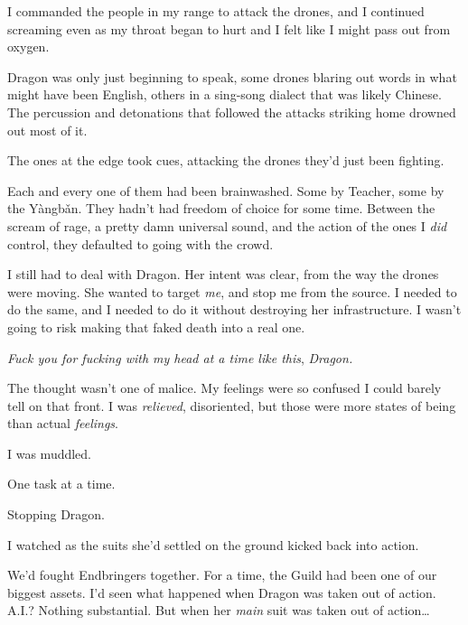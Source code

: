 I commanded the people in my range to attack the drones, and I continued screaming even as my throat began to hurt and I felt like I might pass out from oxygen.



Dragon was only just beginning to speak, some drones blaring out words in what might have been English, others in a sing-song dialect that was likely Chinese.  The percussion and detonations that followed the attacks striking home drowned out most of it.



The ones at the edge took cues, attacking the drones they'd just been fighting.



Each and every one of them had been brainwashed.  Some by Teacher, some by the Y\`{a}ngb\v{a}n. They hadn't had freedom of choice for some time.  Between the scream of rage, a pretty damn universal sound, and the action of the ones I \emph{did} control, they defaulted to going with the crowd.



I still had to deal with Dragon.  Her intent was clear, from the way the drones were moving.  She wanted to target \emph{me}, and stop me from the source.  I needed to do the same, and I needed to do it without destroying her infrastructure.  I wasn't going to risk making that faked death into a real one.



\emph{Fuck you for fucking with my head at a time like this}, \emph{Dragon.}



The thought wasn't one of malice.  My feelings were so confused I could barely tell on that front.  I was \emph{relieved}, disoriented, but those were more states of being than actual \emph{feelings}.



I was muddled.



One task at a time.



Stopping Dragon.



I watched as the suits she'd settled on the ground kicked back into action.



We'd fought Endbringers together.  For a time, the Guild had been one of our biggest assets.  I'd seen what happened when Dragon was taken out of action.  A.I.?  Nothing substantial.  But when her \emph{main} suit was taken out of action\ldots



